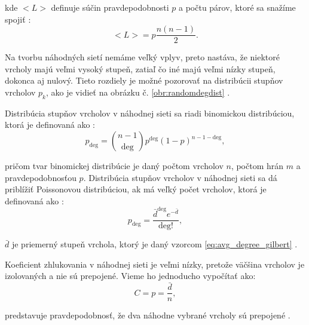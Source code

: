 kde $<L>$ definuje súčin pravdepodobnosti $p$ a počtu párov, ktoré sa snažíme spojiť \cite{barabasi2016network} :
\begin{equation}
    <L> = p\frac{n(n-1)}{2}.
    \label{eq:avg_edges_gilbert}
\end{equation}

Na tvorbu náhodných sietí nemáme veľký vplyv, preto nastáva, že niektoré vrcholy majú veľmi vysoký stupeň, 
zatiaľ čo iné majú veľmi nízky stupeň, dokonca aj nulový. Tieto rozdiely je možné pozorovať na distribúcii
stupňov vrcholov $p_k$, ako je vidieť na obrázku č. \ref{obr:randomdegdist} \cite{barabasi2016network} .

Distribúcia stupňov vrcholov v náhodnej sieti sa riadi binomickou distribúciou, ktorá je definovaná ako \cite{barabasi2016network} :
\begin{equation}
    p_{\mathrm{deg}} = \binom{n-1}{\mathrm{deg}} p^{\mathrm{deg}} (1-p)^{n-1-\mathrm{deg}},
    \label{eq:binomial_distribution}        
\end{equation}

pričom tvar binomickej distribúcie je daný počtom vrcholov $n$, počtom hrán $m$ a pravdepodobnosťou $p$.
Distribúcia stupňov vrcholov v náhodnej sieti sa dá priblížiť Poissonovou distribúciou, ak má veľký počet vrcholov,
ktorá je definovaná ako \cite{barabasi2016network} :
\begin{equation}
    p_{\mathrm{deg}} = \frac{\bar{d}^{\mathrm{deg}} e^{-\bar{d}}}{\mathrm{deg}!},
    \label{eq:poisson_distribution}
\end{equation}

$\bar{d}$ je priemerný stupeň vrchola, ktorý je daný vzorcom \ref{eq:avg_degree_gilbert} .

Koeficient zhlukovania v náhodnej sieti je veľmi nízky, pretože väčšina vrcholov je izolovaných a nie sú prepojené.
Vieme ho jednoducho vypočítať ako:
\begin{equation}
    C = p = \frac{\bar{d}}{n},
    \label{eq:clustering_coefficient_random}
\end{equation}

predstavuje pravdepodobnosť, že dva náhodne vybrané vrcholy sú prepojené \cite{barabasi2016network} .

